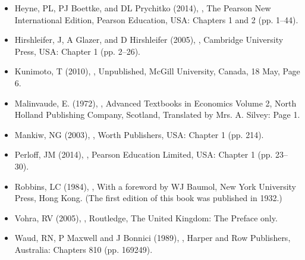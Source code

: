 \documentclass[letterpaper,10pt,english]{jupyterBook}
\begin{document}
\begin{itemize}
\item {} 
\sphinxAtStartPar
Heyne, PL, PJ Boettke, and DL Prychitko (2014), , The Pearson New International Edition, Pearson Education, USA: Chapters 1 and 2 (pp. 1–44).

\item {} 
\sphinxAtStartPar
Hirshleifer, J, A Glazer, and D Hirshleifer (2005), , Cambridge University Press, USA: Chapter 1 (pp. 2–26).

\item {} 
\sphinxAtStartPar
Kunimoto, T (2010), , Unpublished, McGill University, Canada, 18 May, Page 6.

\item {} 
\sphinxAtStartPar
Malinvaude, E. (1972), , Advanced Textbooks in Economics Volume 2, North Holland Publishing Company, Scotland, Translated by Mrs. A. Silvey: Page 1.

\item {} 
\sphinxAtStartPar
Mankiw, NG (2003), , Worth Publishers, USA: Chapter 1 (pp. 2\sphinxhyphen{}14).

\item {} 
\sphinxAtStartPar
Perloff, JM (2014), , Pearson Education Limited, USA: Chapter 1 (pp. 23–30).

\item {} 
\sphinxAtStartPar
Robbins, LC (1984), , With a foreword by WJ Baumol, New York University Press, Hong Kong. (The first edition of this book was published in 1932.)

\item {} 
\sphinxAtStartPar
Vohra, RV (2005), , Routledge, The United Kingdom: The Preface only.

\item {} 
\sphinxAtStartPar
Waud, RN, P Maxwell and J Bonnici (1989), , Harper and Row Publishers, Australia: Chapters 8\sphinxhyphen{}10 (pp. 169\sphinxhyphen{}249).

\end{itemize}
\end{document}
